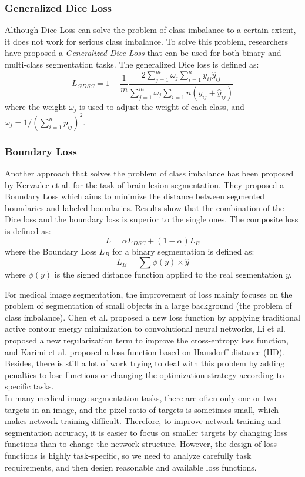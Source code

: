 \subsubsection{Generalized Dice Loss}
Although Dice Loss can solve the problem of class imbalance to a certain extent, it does not work for serious class imbalance.
To solve this problem, researchers have proposed a \emph{Generalized Dice Loss} that can be used for both binary and multi-class segmentation tasks. The generalized Dice loss is defined as:
$$
L_{GDSC} = 1 - \frac{1}{m}\frac{2\sum_{j=1}^{m} \omega_j
\sum_{i=1}^{n}y_{ij}\hat{y}_{ij}}{\sum_{j=1}^{m}\omega_j\sum_{i=1}{n}(y_{ij} +
\hat{y}_{ij})}
$$
where the weight $\omega_j$ is used to adjust the weight of each class, and $\omega_j = 1/(\sum_{i=1}^{n}p_{ij})^2$.

\subsubsection{Boundary Loss}
Another approach that solves the problem of class imbalance has been proposed by Kervadec et al. for the task of brain lesion segmentation. They proposed a Boundary Loss which aims to minimize the distance between segmented boundaries and labeled boundaries. Results show that the combination of the Dice loss and the boundary loss is superior to the single ones. The composite loss is defined as:
$$
L = \alpha L_{DSC} + (1 - \alpha) L_{B}
$$
where the Boundary Loss $L_{B}$ for a binary segmentation is defined as:
$$
L_{B} = \sum \phi(y) \times \hat{y}
$$
where $\phi(y)$ is the signed distance function applied to the real segmentation $y$.

\par
For medical image segmentation, the improvement of loss mainly focuses on the
problem of segmentation of small objects in a large background (the problem of
class imbalance). Chen et al. proposed a new loss function by applying
traditional active contour energy minimization to convolutional neural networks,
Li et al. proposed a new regularization term to improve the cross-entropy loss
function, and Karimi et al. proposed a loss function based on Hausdorff
distance (HD). Besides, there is still a lot of work trying to deal with this
problem by adding penalties to lose functions or changing the optimization
strategy according to specific tasks.\\
In many medical image segmentation tasks, there are often only one or two
targets in an image, and the pixel ratio of targets is sometimes small, which
makes network training difficult. Therefore, to improve network training and
segmentation accuracy, it is easier to focus on smaller targets by changing loss
functions than to change the network structure. However, the design of loss
functions is highly task-specific, so we need to analyze carefully task
requirements, and then design reasonable and available loss functions.

